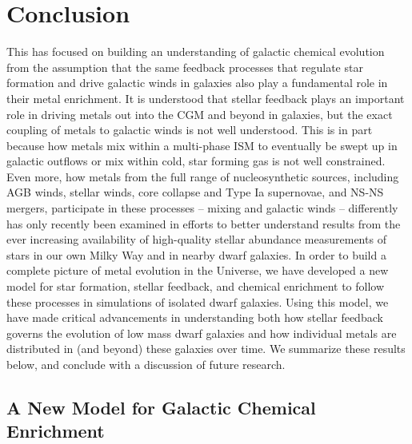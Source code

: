 \chapter[Conclusion]{Conclusion}
\label{ch:conclusion}


This \dissertation has focused on building an understanding of galactic chemical evolution from the assumption that the same feedback processes that regulate star formation and drive galactic winds in galaxies also play a fundamental role in their metal enrichment. It is understood that stellar feedback plays an important role in driving metals out into the CGM and beyond in galaxies, but the exact coupling of metals to galactic winds is not well understood. This is in part because how metals mix within a multi-phase ISM to eventually be swept up in galactic outflows or mix within cold, star forming gas is not well constrained. Even more, how metals from the full range of nucleosynthetic sources, including AGB winds, stellar winds, core collapse and Type Ia supernovae, and NS-NS mergers, participate in these processes -- mixing and galactic winds -- differently has only recently been examined in efforts to better understand results from the ever increasing availability of high-quality stellar abundance measurements of stars in our own Milky Way and in nearby dwarf galaxies. In order to build a complete picture of metal evolution in the Universe, we have developed a new model for star formation, stellar feedback, and chemical enrichment to follow these processes in simulations of isolated dwarf galaxies. Using this model, we have made critical advancements in understanding both how stellar feedback governs the evolution of low mass dwarf galaxies and how individual metals are distributed in (and beyond) these galaxies over time. We summarize these results below, and conclude with a discussion of future research.


\section{A New Model for Galactic Chemical Enrichment}
\label{conclusion:sec:ch1}

